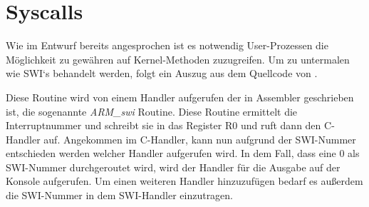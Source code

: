 \section{Syscalls}
Wie im Entwurf bereits angesprochen ist es notwendig User-Prozessen die M\"oglichkeit zu gew\"ahren auf Kernel-Methoden zuzugreifen. Um zu untermalen wie SWI`s behandelt werden, folgt ein Auszug aus dem Quellcode von \mops.

Diese Routine wird von einem Handler aufgerufen der in Assembler geschrieben ist, die sogenannte \textit{ARM\_swi} Routine. Diese Routine ermittelt die Interruptnummer und schreibt sie in das Register R0 und ruft dann den C-Handler auf. Angekommen im C-Handler, kann nun aufgrund der SWI-Nummer entschieden werden welcher Handler aufgerufen wird. In dem Fall, dass eine 0 als SWI-Nummer durchgeroutet wird, wird der Handler f\"ur die Ausgabe auf der Konsole aufgerufen. Um einen weiteren Handler hinzuzuf\"ugen bedarf es au\ss erdem die SWI-Nummer in dem SWI-Handler einzutragen.

